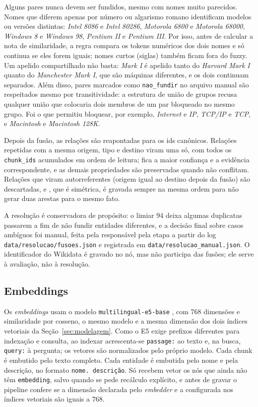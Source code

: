 Alguns pares nunca devem ser fundidos, mesmo com nomes muito parecidos. Nomes que diferem apenas por número ou algarismo romano identificam modelos ou versões distintas: \emph{Intel 8086} e \emph{Intel 80286}, \emph{Motorola 6800} e \emph{Motorola 68000}, \emph{Windows 8} e \emph{Windows 98}, \emph{Pentium II} e \emph{Pentium III}. Por isso, antes de calcular a nota de similaridade, a regra compara os tokens numéricos dos dois nomes e só continua se eles forem iguais; nomes curtos (siglas) também ficam fora do fuzzy. Um apelido compartilhado não basta: \emph{Mark I} é apelido tanto do \emph{Harvard Mark I} quanto do \emph{Manchester Mark I}, que são máquinas diferentes, e os dois continuam separados. Além disso, pares marcados como \texttt{nao\_fundir} no arquivo manual são respeitados mesmo por transitividade: a estrutura de união de grupos recusa qualquer união que colocaria dois membros de um par bloqueado no mesmo grupo. Foi o que permitiu bloquear, por exemplo, \emph{Internet} e \emph{IP}, \emph{TCP/IP} e \emph{TCP}, e \emph{Macintosh} e \emph{Macintosh 128K}.

Depois da fusão, as relações são reapontadas para os ids canônicos. Relações repetidas com a mesma origem, tipo e destino viram uma só, com todos os \texttt{chunk\_ids} acumulados em ordem de leitura; fica a maior confiança e a evidência correspondente, e as demais propriedades são preservadas quando não conflitam. Relações que viram autorreferentes (origem igual ao destino depois da fusão) são descartadas, e , que é simétrica, é gravada sempre na mesma ordem para não gerar duas arestas para o mesmo fato.

A resolução é conservadora de propósito: o limiar 94 deixa algumas duplicatas passarem a fim de não fundir entidades diferentes, e a decisão final sobre casos ambíguos foi manual, feita pela responsável pela etapa a partir do log \texttt{data/resolucao/fusoes.json} e registrada em \texttt{data/resolucao\_manual.json}. O identificador do Wikidata é gravado no nó, mas não participa das fusões; ele serve à avaliação, não à resolução.

\subsection{Embeddings}

Os \emph{embeddings} usam o modelo \texttt{multilingual-e5-base} \cite{wang2024me5}, com 768 dimensões e similaridade por cosseno, o mesmo modelo e a mesma dimensão dos dois índices vetoriais da Seção~\ref{sec:modelagem}. Como o E5 exige prefixos diferentes para indexação e consulta, ao indexar acrescenta-se \texttt{passage:} ao texto e, na busca, \texttt{query:} à pergunta; os vetores são normalizados pelo próprio modelo. Cada chunk é embutido pelo texto completo. Cada entidade é embutida pelo nome e pela descrição, no formato \texttt{nome. descrição}. Só recebem vetor os nós que ainda não têm \texttt{embedding}, salvo quando se pede recálculo explícito, e antes de gravar o pipeline confere se a dimensão declarada pelo \emph{embedder} e a configurada nos índices vetoriais são iguais a 768.

